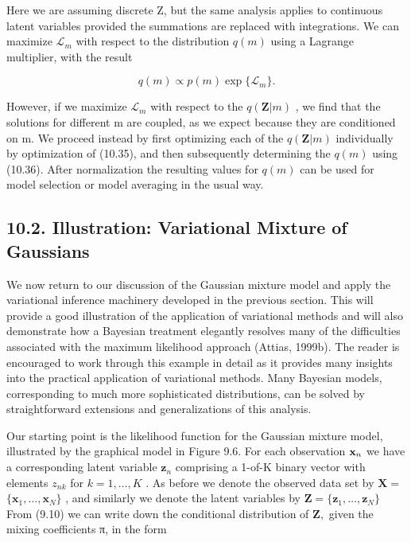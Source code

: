 \documentclass[
  10
]{article}
\begin{document}
Here we are assuming discrete Z, but the same analysis applies to
continuous latent variables provided the summations are replaced with
integrations. We can maximize \({ \mathcal { L } } _ { m }\) with
respect to the distribution \(q ( m )\) using a Lagrange multiplier,
with the result

\[
q (m) \propto p (m) \exp \{\mathcal {L} _ {m} \}.\tag{10.36}
\]

However, if we maximize \({ \mathcal { L } } _ { m }\) with respect to
the \(q ( \mathbf { Z } | m )\) , we find that the solutions for
different m are coupled, as we expect because they are conditioned on m.
We proceed instead by first optimizing each of the
\(q ( \mathbf { Z } | m )\) individually by optimization of (10.35), and
then subsequently determining the \(q ( m )\) using (10.36). After
normalization the resulting values for \(q ( m )\) can be used for model
selection or model averaging in the usual way.

\subsection{10.2. Illustration: Variational Mixture of
Gaussians}\label{illustration-variational-mixture-of-gaussians}

We now return to our discussion of the Gaussian mixture model and apply
the variational inference machinery developed in the previous section.
This will provide a good illustration of the application of variational
methods and will also demonstrate how a Bayesian treatment elegantly
resolves many of the difficulties associated with the maximum likelihood
approach (Attias, 1999b). The reader is encouraged to work through this
example in detail as it provides many insights into the practical
application of variational methods. Many Bayesian models, corresponding
to much more sophisticated distributions, can be solved by
straightforward extensions and generalizations of this analysis.

Our starting point is the likelihood function for the Gaussian mixture
model, illustrated by the graphical model in Figure 9.6. For each
observation \({ \bf x } _ { n }\) we have a corresponding latent
variable \(\mathbf { z } _ { n }\) comprising a 1-of-K binary vector
with elements \(z _ { n k }\) for \(k = 1 , \ldots , K\) . As before we
denote the observed data set by \(\mathbf { X } =\)
\(\{ \mathbf { x } _ { 1 } , \hdots , \mathbf { x } _ { N } \}\) , and
similarly we denote the latent variables by
\(\mathbf { Z } = \{ \mathbf { z } _ { 1 } , \dotsc , \mathbf { z } _ { N } \}\)
From (9.10) we can write down the conditional distribution of
\(\mathbf { Z } ,\) given the mixing coefficients π, in the form
\end{document}
